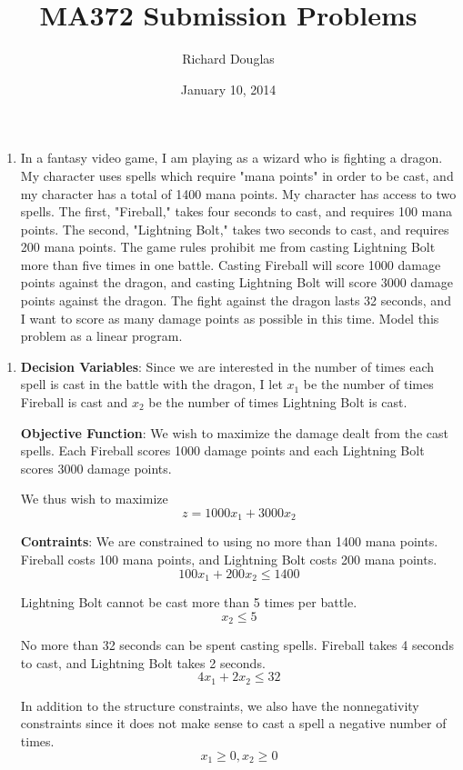 \documentclass{article}
\title{MA372 Submission Problems}
\author{Richard Douglas}
\date{January 10,  2014}
\begin{document}
  \maketitle
  \begin{enumerate}
  \item In a fantasy video game, I am playing as a wizard who is fighting a dragon. My character
  uses spells which require "mana points" in order to be cast, and my character has a total of
  1400 mana points. My character has access to two spells. The first, "Fireball," takes four
  seconds to cast, and requires 100 mana points. The second, "Lightning Bolt," takes two
  seconds to cast, and requires 200 mana points. The game rules prohibit me from casting
  Lightning Bolt more than five times in one battle. Casting Fireball will score 1000 damage
  points against the dragon, and casting Lightning Bolt will score 3000 damage points against
  the dragon. The fight against the dragon lasts 32 seconds, and I want to score as many
  damage points as possible in this time. Model this problem as a linear program. \newline{}
  \end{enumerate}
  
  \begin{enumerate}
  \item 
  \textbf{Decision Variables}: Since we are interested in the number of times each spell is cast in the battle with the dragon,
  I let $x_1$ be the number of times Fireball is cast and $x_2$ be the number of times Lightning Bolt is cast. \newline{}
  
  \textbf{Objective Function}: We wish to maximize the damage dealt from the cast spells. 
  Each Fireball scores 1000 damage points and each Lightning Bolt scores 3000 damage points. \newline{}
  
  We thus wish to maximize
  $$z = 1000x_1 + 3000x_2$$
  
   \textbf{Contraints}: We are constrained to using no more than 1400 mana points. 
   Fireball costs 100 mana points, and Lightning Bolt costs 200 mana points.
   $$100x_1 +  200x_2 \le 1400$$
   
   Lightning Bolt cannot be cast more than 5 times per battle.
   $$x_2 \le 5$$
   
   No more than 32 seconds can be spent casting spells.
   Fireball takes 4 seconds to cast, and Lightning Bolt takes 2 seconds.
   $$4x_1 + 2x_2 \le 32$$
   
   In addition to the structure constraints, we also have the nonnegativity constraints since
   it does not make sense to cast a spell a negative number of times.
   $$x_1 \ge 0, x_2 \ge 0$$
  \end{enumerate}
  
\end{document}
